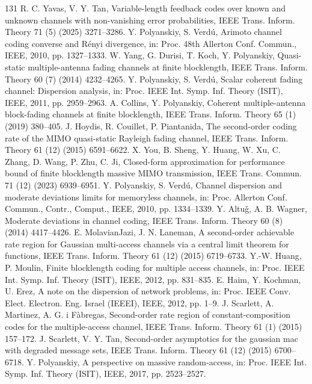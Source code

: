 \begin{thebibliography}{131}
 R. C. Yavas, V. Y. Tan, Variable-length feedback codes over known and unknown channels with non-vanishing error probabilities, IEEE Trans. Inform. Theory 71 (5) (2025) 3271--3286.
 Y. Polyanskiy, S. Verdú, Arimoto channel coding converse and Rényi divergence, in: Proc. 48th Allerton Conf. Commun., IEEE, 2010, pp. 1327--1333.
 W. Yang, G. Durisi, T. Koch, Y. Polyanskiy, Quasi-static multiple-antenna fading channels at finite blocklength, IEEE Trans. Inform. Theory 60 (7) (2014) 4232--4265.
 Y. Polyanskiy, S. Verdú, Scalar coherent fading channel: Dispersion analysis, in: Proc. IEEE Int. Symp. Inf. Theory (ISIT), IEEE, 2011, pp. 2959--2963.
 A. Collins, Y. Polyanskiy, Coherent multiple-antenna block-fading channels at finite blocklength, IEEE Trans. Inform. Theory 65 (1) (2019) 380--405.
 J. Hoydis, R. Couillet, P. Piantanida, The second-order coding rate of the MIMO quasi-static Rayleigh fading channel, IEEE Trans. Inform. Theory 61 (12) (2015) 6591--6622.
 X. You, B. Sheng, Y. Huang, W. Xu, C. Zhang, D. Wang, P. Zhu, C. Ji, Closed-form approximation for performance bound of finite blocklength massive MIMO transmission, IEEE Trans. Commun. 71 (12) (2023) 6939--6951.
 Y. Polyanskiy, S. Verdú, Channel dispersion and moderate deviations limits for memoryless channels, in: Proc. Allerton Conf. Commun., Contr., Comput., IEEE, 2010, pp. 1334--1339.
 Y. Altuǧ, A. B. Wagner, Moderate deviations in channel coding, IEEE Trans. Inform. Theory 60 (8) (2014) 4417--4426.
 E. MolavianJazi, J. N. Laneman, A second-order achievable rate region for Gaussian multi-access channels via a central limit theorem for functions, IEEE Trans. Inform. Theory 61 (12) (2015) 6719--6733.
 Y.-W. Huang, P. Moulin, Finite blocklength coding for multiple access channels, in: Proc. IEEE Int. Symp. Inf. Theory (ISIT), IEEE, 2012, pp. 831--835.
 E. Haim, Y. Kochman, U. Erez, A note on the dispersion of network problems, in: Proc. IEEE Conv. Elect. Electron. Eng. Israel (IEEEI), IEEE, 2012, pp. 1--9.
 J. Scarlett, A. Martinez, A. G. i Fàbregas, Second-order rate region of constant-composition codes for the multiple-access channel, IEEE Trans. Inform. Theory 61 (1) (2015) 157--172.
 J. Scarlett, V. Y. Tan, Second-order asymptotics for the gaussian mac with degraded message sets, IEEE Trans. Inform. Theory 61 (12) (2015) 6700--6718.
 Y. Polyanskiy, A perspective on massive random-access, in: Proc. IEEE Int. Symp. Inf. Theory (ISIT), IEEE, 2017, pp. 2523--2527.

\end{thebibliography}
